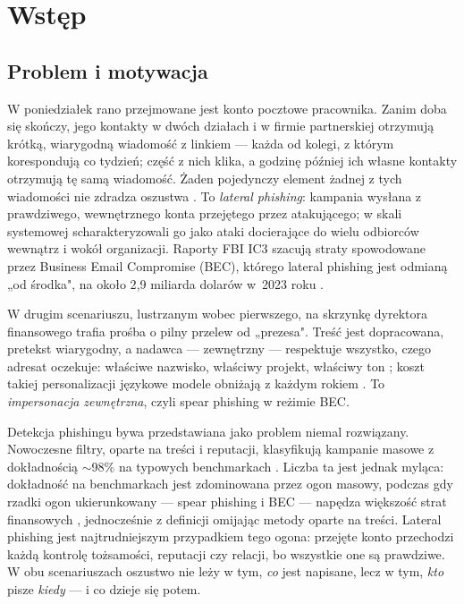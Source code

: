 \chapter{Wstęp}
\label{rozd:wstep}

\section{Problem i motywacja}
\label{sec:w-problem}

W poniedziałek rano przejmowane jest konto pocztowe pracownika. Zanim
doba się skończy, jego kontakty w dwóch działach i w firmie partnerskiej
otrzymują krótką, wiarygodną wiadomość z linkiem --- każda od kolegi, z
którym korespondują co tydzień; część z nich klika, a godzinę później
ich własne kontakty otrzymują tę samą wiadomość. Żaden pojedynczy
element żadnej z tych wiadomości nie zdradza oszustwa
\citep{butavicius2022why,sturman2025security}. To \emph{lateral phishing}:
kampania wysłana z prawdziwego, wewnętrznego konta przejętego przez
atakującego; w skali systemowej scharakteryzowali go \citet{ho2019detecting}
jako ataki docierające do wielu odbiorców wewnątrz i wokół organizacji.
Raporty FBI IC3 szacują straty spowodowane przez Business Email Compromise
(BEC), którego lateral phishing jest odmianą „od środka", na około
2{,}9 miliarda dolarów w~2023 roku \citep{fbi2024ic3}.

W drugim scenariuszu, lustrzanym wobec pierwszego, na skrzynkę dyrektora
finansowego trafia prośba o pilny przelew od „prezesa". Treść jest
dopracowana, pretekst wiarygodny, a nadawca --- zewnętrzny --- respektuje
wszystko, czego adresat oczekuje: właściwe nazwisko, właściwy projekt,
właściwy ton \citep{dewan2014analyzing,brown2025web}; koszt takiej
personalizacji językowe modele obniżają z każdym rokiem
\citep{bethany2024evaluating}. To \emph{impersonacja zewnętrzna}, czyli
spear phishing w reżimie BEC.

Detekcja phishingu bywa przedstawiana jako problem niemal rozwiązany.
Nowoczesne filtry, oparte na treści i reputacji, klasyfikują kampanie
masowe z dokładnością $\sim$98\% na typowych benchmarkach
\citep{birthriya2025detection,tan2020graph}. Liczba ta jest jednak
myląca: dokładność na benchmarkach jest zdominowana przez ogon masowy,
podczas gdy rzadki ogon ukierunkowany --- spear phishing i BEC ---
napędza większość strat finansowych \citep{cidon2019high,ho2019detecting},
jednocześnie z definicji omijając metody oparte na treści. Lateral phishing
jest najtrudniejszym przypadkiem tego ogona: przejęte konto przechodzi
każdą kontrolę tożsamości, reputacji czy relacji, bo wszystkie one są
prawdziwe. W obu scenariuszach oszustwo nie leży w tym, \emph{co} jest
napisane, lecz w tym, \emph{kto} pisze \emph{kiedy} --- i co dzieje się
potem.

